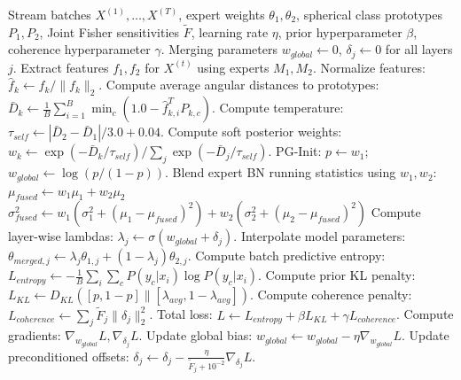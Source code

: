 \documentclass{article}
\theoremstyle{definition}
\theoremstyle{remark}
\begin{document}
\begin{algorithm}[tb]
\caption{Soft Bayesian Angular Routing with Adaptive Consensus Regularization (BAR-ACR)}
\label{alg:bar_acr}
\begin{algorithmic}[1]
 Stream batches $X^{(1)}, \dots, X^{(T)}$, expert weights $\theta_1, \theta_2$, spherical class prototypes $P_{1}, P_{2}$, Joint Fisher sensitivities $\tilde{F}$, learning rate $\eta$, prior hyperparameter $\beta$, coherence hyperparameter $\gamma$.
 Merging parameters $w_{global} \leftarrow 0$, $\delta_j \leftarrow 0$ for all layers $j$.
    \STATE Extract features $f_1, f_2$ for $X^{(t)}$ using experts $M_1, M_2$.
    \STATE Normalize features: $\hat{f}_k \leftarrow f_k / \|f_k\|_2$.
    \STATE Compute average angular distances to prototypes:
    \STATE \quad $\bar{D}_k \leftarrow \frac{1}{B} \sum_{i=1}^B \min_c \left(1.0 - \hat{f}_{k,i}^T P_{k,c}\right)$.
    \STATE Compute temperature: $\tau_{self} \leftarrow |\bar{D}_2 - \bar{D}_1| / 3.0 + 0.04$.
    \STATE Compute soft posterior weights:
    \STATE \quad $w_k \leftarrow \exp(-\bar{D}_k / \tau_{self}) / \sum_j \exp(-\bar{D}_j / \tau_{self})$.
    \STATE PG-Init: $p \leftarrow w_1$; $w_{global} \leftarrow \log(p / (1-p))$.
    \STATE Blend expert BN running statistics using $w_1, w_2$:
    \STATE \quad $\mu_{fused} \leftarrow w_1 \mu_1 + w_2 \mu_2$
    \STATE \quad $\sigma_{fused}^2 \leftarrow w_1 (\sigma_1^2 + (\mu_1 - \mu_{fused})^2) + w_2 (\sigma_2^2 + (\mu_2 - \mu_{fused})^2)$
        \STATE Compute layer-wise lambdas: $\lambda_j \leftarrow \sigma(w_{global} + \delta_j)$.
        \STATE Interpolate model parameters: $\theta_{merged, j} \leftarrow \lambda_j \theta_{1, j} + (1 - \lambda_j) \theta_{2, j}$.
        \STATE Compute batch predictive entropy: $L_{entropy} \leftarrow -\frac{1}{B} \sum_{i} \sum_{c} P(y_c|x_i) \log P(y_c|x_i)$.
        \STATE Compute prior KL penalty: $L_{KL} \leftarrow D_{KL}([p, 1-p] \| [\lambda_{avg}, 1-\lambda_{avg}])$.
        \STATE Compute coherence penalty: $L_{coherence} \leftarrow \sum_j \tilde{F}_j \|\delta_j\|_2^2$.
        \STATE Total loss: $L \leftarrow L_{entropy} + \beta L_{KL} + \gamma L_{coherence}$.
        \STATE Compute gradients: $\nabla_{w_{global}} L, \nabla_{\delta_j} L$.
        \STATE Update global bias: $w_{global} \leftarrow w_{global} - \eta \nabla_{w_{global}} L$.
        \STATE Update preconditioned offsets:
        \STATE \quad $\delta_j \leftarrow \delta_j - \frac{\eta}{\tilde{F}_j + 10^{-2}} \nabla_{\delta_j} L$.
    \ENDFOR
\ENDFOR
\end{algorithmic}
\end{algorithm}
\end{document}
